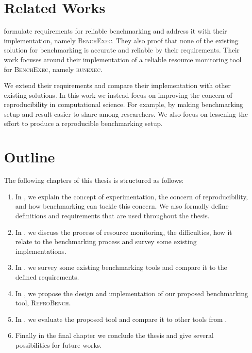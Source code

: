 \section{Related Works}
\label{sec:intro.related}

\citet{beyerReliableBenchmarkingRequirements2019} formulate requirements for reliable benchmarking and address it with their implementation, namely \textsc{BenchExec}.
They also proof that none of the existing solution for benchmarking is accurate and reliable by their requirements.
Their work focuses around their implementation of a reliable resource monitoring tool for \textsc{BenchExec}, namely \textsc{runexec}.

We extend their requirements and compare their implementation with other existing solutions.
In this work we instead focus on improving the concern of reproducibility in computational science.
For example, by making benchmarking setup and result easier to share among researchers.
We also focus on lessening the effort to produce a reproducible benchmarking setup.


\section{Outline}
\label{sec:intro.outline}

The following chapters of this thesis is structured as follows:

\begin{enumerate}
	\item In , we explain the concept of experimentation, the concern of reproducibility, and how benchmarking can tackle this concern. We also formally define definitions and requirements that are used throughout the thesis.
	\item In , we discuss the process of resource monitoring, the difficulties, how it relate to the benchmarking process and survey some existing implementations.
	\item In , we survey some existing benchmarking tools and compare it to the defined requirements.
	\item In , we propose the design and implementation of our proposed benchmarking tool, \textsc{ReproBench}.
	\item In , we evaluate the proposed tool and compare it to other tools from .
	\item Finally in the final chapter we conclude the thesis and give several possibilities for future works.
\end{enumerate}
